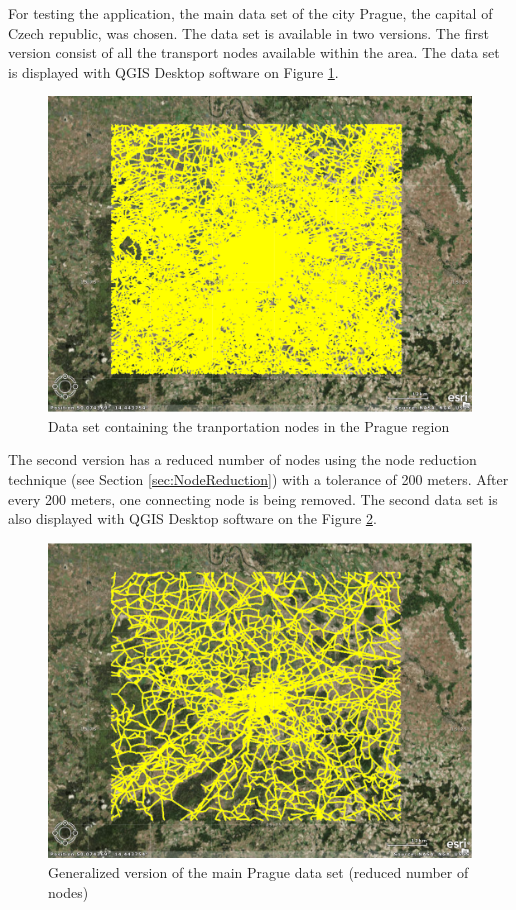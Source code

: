 \documentclass[thesis=M,english]{FITthesis}[2012/10/20]
\begin{document}
For testing the application, the main data set of the city Prague, the capital of Czech republic, was chosen. The data set is available in two versions. The first version consist of all the transport nodes available within the area. 
The data set is displayed with QGIS Desktop software on Figure \ref{pic:dataset1}.
\begin{figure}[H]
\centering
\includegraphics[width=1\textwidth]{pics/praguedatasetL}
\caption{Data set containing the tranportation nodes in the Prague region}
\label{pic:dataset1}
\end{figure}

The second version has a reduced number of nodes using the node reduction technique (see Section \ref{sec:NodeReduction}) with a tolerance of 200 meters. After every 200 meters, one connecting node is being removed.
The second data set is also displayed with QGIS Desktop software on the Figure \ref{pic:dataset2}.
\begin{figure}[H]
\centering
\includegraphics[width=1\textwidth]{pics/praguedatasetS}
\caption{Generalized version of the main Prague data set (reduced number of nodes)}
\label{pic:dataset2}
\end{figure}
\end{document}
